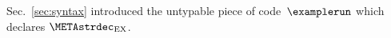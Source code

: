 \documentclass{jfp1}
\newcommand{\sizeintablesp}{footnotesize}
\begin{document}
Sec.~\ref{sec:syntax} introduced the untypable piece of
code~$\examplerun$ which declares
$\METAstrdec_{\mathrm{EX}}$.
%
\end{document}
